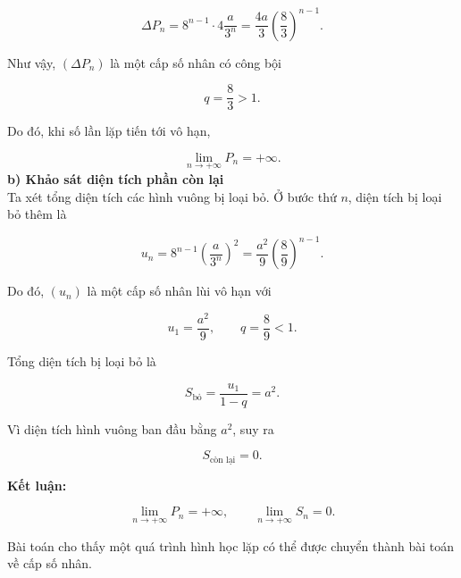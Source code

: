 \documentclass[12pt,a4paper]{article}
\begin{document}
\[
\Delta P_n
=8^{n-1}\cdot4\frac{a}{3^n}
=\frac{4a}{3}
\left(\frac{8}{3}\right)^{n-1}.
\]

\noindent Như vậy, $(\Delta P_n)$ là một cấp số nhân có công bội

\[
q=\frac{8}{3}>1.
\]

\noindent Do đó, khi số lần lặp tiến tới vô hạn,

\[
\boxed{\lim_{n\to+\infty}P_n=+\infty}.
\]
\textbf{b) Khảo sát diện tích phần còn lại} \\
Ta xét tổng diện tích các hình vuông bị loại bỏ. Ở bước thứ $n$,
diện tích bị loại bỏ thêm là

\[
u_n
=8^{n-1}\left(\frac{a}{3^n}\right)^2
=\frac{a^2}{9}
\left(\frac{8}{9}\right)^{n-1}.
\]

\noindent Do đó, $(u_n)$ là một cấp số nhân lùi vô hạn với

\[
u_1=\frac{a^2}{9},
\qquad
q=\frac{8}{9}<1.
\]

\noindent Tổng diện tích bị loại bỏ là

\[
S_{\text{bỏ}}
=\frac{u_1}{1-q}
=a^2.
\]

\noindent Vì diện tích hình vuông ban đầu bằng $a^2$, suy ra

\[
\boxed{S_{\text{còn lại}}=0}.
\]

\noindent \textbf{Kết luận:}

\[
\boxed{
\lim_{n\to+\infty}P_n=+\infty,
\qquad
\lim_{n\to+\infty}S_n=0.
}
\]

\noindent Bài toán cho thấy một quá trình hình học lặp có thể được chuyển thành
bài toán về cấp số nhân.
\end{document}
